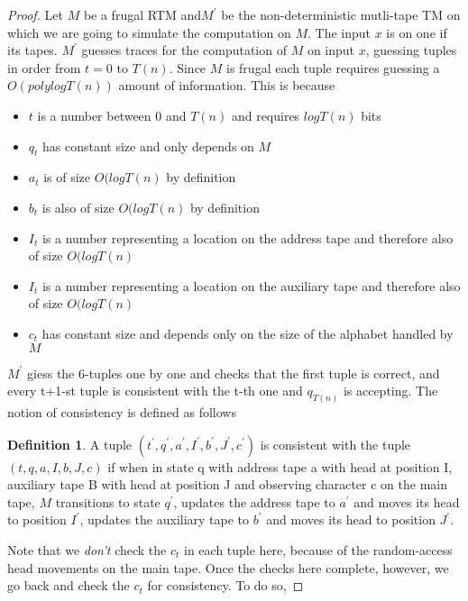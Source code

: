 \documentclass[english]{article}
\theoremstyle{plain}
\theoremstyle{definition}
\newtheorem{defn}[thm]{Definition}
\theoremstyle{plain}
\begin{document}
\begin{proof}
  Let $M$ be a frugal RTM and$M^{'}$ be the non-deterministic
  mutli-tape TM on which we are going to simulate the computation on
  $M$. The input $x$ is on one if its tapes. $M^{'}$ guesses traces
  for the computation of $M$ on input $x$, guessing tuples in order
  from $t = 0$ to $T(n)$. Since $M$ is frugal each tuple requires
  guessing a $O(polylog T(n))$ amount of information. This is because

  \begin{itemize}
  \item $t$ is a number between $0$ and $T(n)$ and requires $log T(n)$
    bits
  \item $q_t$ has constant size and only depends on $M$
  \item $a_t$ is of size $O(log T(n)$ by definition
  \item $b_t$ is also of size $O(log T(n)$ by definition
  \item $I_t$ is a number representing a location on the address tape
    and therefore also of size $O(log T(n)$
  \item $I_t$ is a number representing a location on the auxiliary tape
    and therefore also of size $O(log T(n)$
  \item $c_t$ has constant size and depends only on the size of the
    alphabet handled by $M$
  \end{itemize}

  $M^{'}$ giess the 6-tuples one by one and checks that the first tuple
  is correct, and every t+1-st tuple is consistent with the t-th one and
  $q_{T(n)}$ is accepting. The notion of consistency is defined as
  follows

  \begin{defn}
    A tuple $(t^{'}, q^{'}, a^{'}, I^{'}, b^{'}, J^{'}, c^{'})$ is
    consistent with the tuple $(t, q, a, I, b, J, c)$ if when in state q
    with address tape a with head at position I, auxiliary tape B with
    head at position J and observing character c on the main tape, $M$
    transitions to state $q^{'}$, updates the address tape to $a^{'}$
    and moves its head to position $I^{'}$, updates the auxiliary tape
    to $b^{'}$ and moves its head to position $J^{'}$.
  \end{defn}

  Note that we \emph{don't} check the $c_{t}$ in each tuple here,
  because of the random-access head movements on the main tape. Once the
  checks here complete, however, we go back and check the $c_{t}$ for
  consistency. To do so,


\end{proof}
\end{document}
